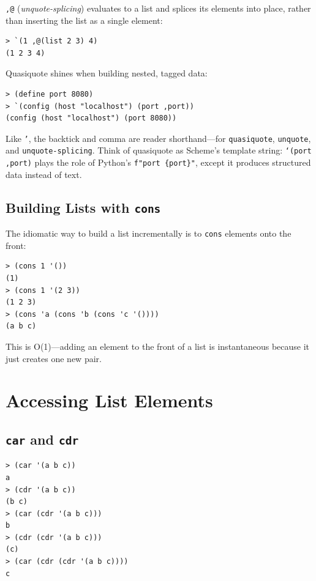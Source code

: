 \texttt{,@} (\emph{unquote-splicing}) evaluates to a list and splices its elements into place, rather than inserting the list as a single element:

\begin{lstlisting}[style=repl]
> `(1 ,@(list 2 3) 4)
(1 2 3 4)
\end{lstlisting}

Quasiquote shines when building nested, tagged data:

\begin{lstlisting}[style=repl]
> (define port 8080)
> `(config (host "localhost") (port ,port))
(config (host "localhost") (port 8080))
\end{lstlisting}

Like \texttt{'}, the backtick and comma are reader shorthand---for \texttt{quasiquote}, \texttt{unquote}, and \texttt{unquote-splicing}. Think of quasiquote as Scheme's template string: \texttt{`(port ,port)} plays the role of Python's \texttt{f"port \{port\}"}, except it produces structured data instead of text.

\subsection{Building Lists with \texttt{cons}}

The idiomatic way to build a list incrementally is to \texttt{cons} elements onto the front:

\begin{lstlisting}[style=repl]
> (cons 1 '())
(1)
> (cons 1 '(2 3))
(1 2 3)
> (cons 'a (cons 'b (cons 'c '())))
(a b c)
\end{lstlisting}

This is O(1)---adding an element to the front of a list is instantaneous because it just creates one new pair.

\section{Accessing List Elements}

\subsection{\texttt{car} and \texttt{cdr}}

\begin{lstlisting}[style=repl]
> (car '(a b c))
a
> (cdr '(a b c))
(b c)
> (car (cdr '(a b c)))
b
> (cdr (cdr '(a b c)))
(c)
> (car (cdr (cdr '(a b c))))
c
\end{lstlisting}

